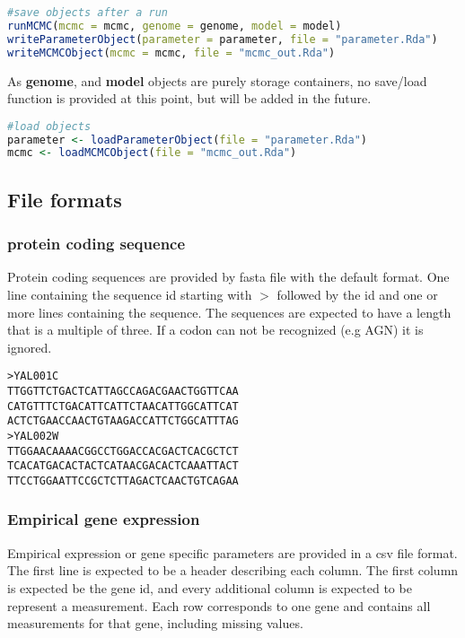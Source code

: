\begin{lstlisting}[language=R]
#save objects after a run
runMCMC(mcmc = mcmc, genome = genome, model = model)
writeParameterObject(parameter = parameter, file = "parameter.Rda")
writeMCMCObject(mcmc = mcmc, file = "mcmc_out.Rda")
\end{lstlisting}

As \textbf{genome}, and \textbf{model} objects are purely storage containers, no save/load function is provided at this point, but will be added in the future.

\begin{lstlisting}[language=R]
#load objects
parameter <- loadParameterObject(file = "parameter.Rda")
mcmc <- loadMCMCObject(file = "mcmc_out.Rda")
\end{lstlisting}

\subsection{File formats}

\subsubsection{protein coding sequence}
Protein coding sequences are provided by fasta file with the default format. One line containing the sequence
id starting with $>$ followed by the id and one or more lines containing the sequence. The sequences are
expected to have a length that is a multiple of three. If a codon can not be recognized (e.g AGN) it is ignored.

\begin{verbatim}
>YAL001C
TTGGTTCTGACTCATTAGCCAGACGAACTGGTTCAA
CATGTTTCTGACATTCATTCTAACATTGGCATTCAT
ACTCTGAACCAACTGTAAGACCATTCTGGCATTTAG
>YAL002W
TTGGAACAAAACGGCCTGGACCACGACTCACGCTCT
TCACATGACACTACTCATAACGACACTCAAATTACT
TTCCTGGAATTCCGCTCTTAGACTCAACTGTCAGAA
\end{verbatim}

\subsubsection{Empirical gene expression}

Empirical expression or gene specific parameters are provided in a csv file format. The first line is expected to
be a header describing each column. The first column is expected be the gene id, and every additional column
is expected to be represent a measurement. Each row corresponds to one gene and contains all measurements
for that gene, including missing values.

